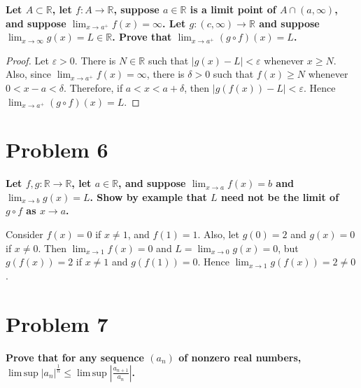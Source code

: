 \textbf{Let \(A \subset \mathbb{R}\), let \(f:A\rightarrow\mathbb{R}\), suppose \(a \in \mathbb{R}\) is a limit point of \(A \cap \left( {a,\infty} \right)\), and suppose \(\lim_{x\rightarrow a^{+}}f(x) = \infty\). Let \(g:\left( {c,\infty} \right)\rightarrow\mathbb{R}\) and suppose \(\lim_{x\rightarrow\infty}g(x) = L \in \mathbb{R}\). Prove that \(\lim_{x\rightarrow a^{+}}\left( {g \circ f} \right)(x) = L\).}

\begin{proof}

Let \(\varepsilon > 0\). There is \(N \in \mathbb{R}\) such that \(\left| {g(x) - L} \right| < \varepsilon\) whenever \(x \geq N\). Also, since \(\lim_{x\rightarrow a^{+}}f(x) = \infty\), there is \(\delta > 0\) such that \(f(x) \geq N\) whenever \(0 < x - a < \delta\). Therefore, if \(a < x < a + \delta\), then \(\left| {g\left( {f(x)} \right) - L} \right| < \varepsilon\). Hence \(\lim_{x\rightarrow a^{+}}\left( {g \circ f} \right)(x) = L\).

\end{proof}

\section{Problem 6}

\textbf{Let \(f,g:\mathbb{R}\rightarrow\mathbb{R}\), let \(a \in \mathbb{R}\), and suppose \(\lim_{x\rightarrow a}f(x) = b\) and \(\lim_{x\rightarrow b}g(x) = L\). Show by example that \(L\) need not be the limit of \(g \circ f\) as \(x\rightarrow a\).}

Consider \(f(x) = 0\) if \(x \neq 1\), and \(f(1) = 1\). Also, let \(g(0) = 2\) and \(g(x) = 0\) if \(x \neq 0\). Then \(\lim_{x\rightarrow 1}f(x) = 0\) and \(L = \lim_{x\rightarrow 0}g(x) = 0\), but \(g\left( {f(x)} \right) = 2\) if \(x \neq 1\) and \(g\left( {f(1)} \right) = 0\). Hence \(\lim_{x\rightarrow 1}g\left( {f(x)} \right) = 2 \neq 0\).

\section{Problem 7}

\textbf{Prove that for any sequence \(\left( a_{n} \right)\) of nonzero real numbers, \(\operatorname{lim\, sup}\left| a_{n} \right|^{\frac{1}{n}} \leq \operatorname{lim\, sup}\left| \frac{a_{n + 1}}{a_{n}} \right|\).}

